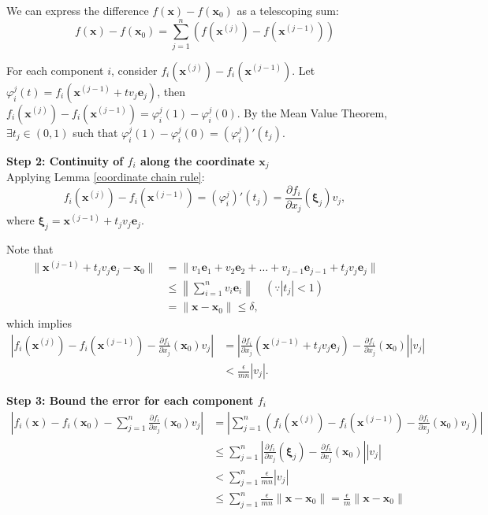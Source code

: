 \documentclass[12pt]{article}
\begin{document}
\begin{dbox}
\begin{pf}
We can express the difference $f(\mathbf{x}) - f(\mathbf{x}_0)$ as a telescoping sum:
$$f(\mathbf{x}) - f(\mathbf{x}_0) = \sum_{j=1}^n \left( f(\mathbf{x}^{(j)}) - f(\mathbf{x}^{(j-1)}) \right)$$

For each component $i$, consider $f_i(\mathbf{x}^{(j)}) - f_i(\mathbf{x}^{(j-1)})$. 
Let $\varphi_i^j(t) = f_i(\mathbf{x}^{(j-1)} + t v_j \mathbf{e}_j)$, then $f_i(\mathbf{x}^{(j)}) - f_i(\mathbf{x}^{(j-1)}) = \varphi^j_i(1)-\varphi^j_i(0)$.
By the Mean Value Theorem, $\exists t_j\in (0,1)$ such that $\varphi^j_i(1)-\varphi^j_i(0) = (\varphi^j_i)'(t_j)$. 

\vspace{0.8em}
\noindent \textbf{Step 2: Continuity of $f_i$ along the coordinate $\mathbf{x}_j$}\\
Applying Lemma \eqref{coordinate chain rule}: 
$$
f_i(\mathbf{x}^{(j)}) - f_i(\mathbf{x}^{(j-1)}) = (\varphi^j_i)'(t_j) = \frac{\partial f_i}{\partial x_j}(\boldsymbol{\xi}_j) v_j,
$$ 
where $\boldsymbol{\xi}_j = \mathbf{x}^{(j-1)} + t_j v_j \mathbf{e}_j$. 

Note that
\begin{align*}
\|\mathbf{x}^{(j-1)} + t_j v_j \mathbf{e}_j - \mathbf{x}_0\| &= \|v_1 \mathbf{e}_1 + v_2 \mathbf{e}_2 + \dots + v_{j-1} \mathbf{e}_{j-1} + t_j v_j \mathbf{e}_j\| \\
&\le \left\| \sum_{i=1}^n v_i \mathbf{e}_i \right\| \quad (\because |t_j| < 1) \\
&= \|\mathbf{x} - \mathbf{x}_0\| \le \delta,
\end{align*}
which implies
\begin{align*}
\left| f_i(\mathbf{x}^{(j)}) - f_i(\mathbf{x}^{(j-1)}) - \frac{\partial f_i}{\partial x_j}(\mathbf{x}_0) v_j \right| 
&= \left| \frac{\partial f_i}{\partial x_j}(\mathbf{x}^{(j-1)} + t_j v_j \mathbf{e}_j) - \frac{\partial f_i}{\partial x_j}(\mathbf{x}_0) \right| |v_j| \\
&< \frac{\epsilon}{mn} |v_j|.
\end{align*}

\vspace{0.8em}
\noindent \textbf{Step 3: Bound the error for each component $f_i$}\\
\begin{align*}
\left| f_i(\mathbf{x}) - f_i(\mathbf{x}_0) - \sum_{j=1}^n \frac{\partial f_i}{\partial x_j}(\mathbf{x}_0) v_j \right| &= \left| \sum_{j=1}^n \left( f_i(\mathbf{x}^{(j)}) - f_i(\mathbf{x}^{(j-1)}) - \frac{\partial f_i}{\partial x_j}(\mathbf{x}_0) v_j \right) \right| \\
&\le \sum_{j=1}^n \left| \frac{\partial f_i}{\partial x_j}(\boldsymbol{\xi}_j) - \frac{\partial f_i}{\partial x_j}(\mathbf{x}_0) \right| |v_j| \\
&< \sum_{j=1}^n \frac{\epsilon}{mn} |v_j| \\
&\le \sum_{j=1}^n \frac{\epsilon}{mn} \|\mathbf{x} - \mathbf{x}_0\| = \frac{\epsilon}{m} \|\mathbf{x} - \mathbf{x}_0\|
\end{align*}


\end{pf}
\end{dbox}
\end{document}
